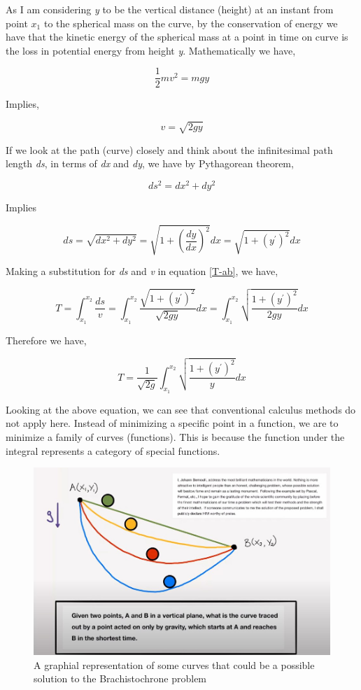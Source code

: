 {As I am considering \textit{y} to be the vertical distance (height) at an instant from point $x_{1}$ to the spherical mass on the curve, by the conservation of energy we have that the kinetic energy of the spherical mass at a point in time on curve is the loss in potential energy from height \textit{y}. Mathematically we have,}

	$$\frac{1}{2}mv^2 = mgy$$ 

{Implies,}

	$$v = \sqrt{2gy}$$

{If we look at the path (curve) closely and think about the infinitesimal path length \textit{ds}, in terms of \textit{dx} and \textit{dy}, we have by Pythagorean theorem,}

	$$ds^2 = dx^2 + dy^2$$

{Implies}

	$$ds = \sqrt{dx^2 + dy^2} = \sqrt{1 + \left(\frac{dy}{dx}\right)^2} dx = \sqrt{1 + \left(y^{\prime}\right)^2} dx$$

{Making a substitution for \textit{ds} and \textit{v} in equation \ref{T-ab}, we have,}

	$$T = \int_{x_1}^{x_2} \frac{ds}{v} = \int_{x_1}^{x_2} \frac{\sqrt{1 + \left(y^{\prime}\right)^2}}{\sqrt{2gy}} dx = \int_{x_1}^{x_2} \sqrt{\frac{1 + \left(y^{\prime}\right)^2}{2gy}} dx$$

{Therefore we have,}

	\begin{equation}
		T = \frac{1}{\sqrt{2g}}\int_{x_1}^{x_2} \sqrt{\frac{1 + \left(y^{\prime}\right)^2}{y}} dx
		\label{Tmin}
	\end{equation}

{Looking at the above equation, we can see that conventional calculus methods do not apply here. Instead of minimizing a specific point in a function, we are to minimize a family of curves (functions). This is because the function under the integral represents a category of special functions.}

\begin{figure}[H]
\centering
\includegraphics[width=13cm]{OrgProbDia.jpg}
    		\caption{{A graphial representation of some curves that could be a possible solution to the Brachistochrone problem}}
\end{figure}

